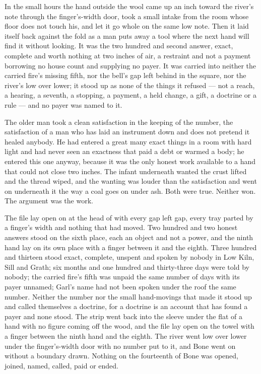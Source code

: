 In the small hours the hand outside the wool came up an inch toward the river's note through the finger's-width door, took a small intake from the room whose floor does not touch his, and let it go whole on the same low note. Then it laid itself back against the fold as a man puts away a tool where the next hand will find it without looking. It was the two hundred and second answer, exact, complete and worth nothing at two inches of air, a restraint and not a payment borrowing no house count and supplying no payer. It was carried into neither the carried fire's missing fifth, nor the bell's gap left behind in the square, nor the river's low over lower; it stood up as none of the things it refused --- not a reach, a hearing, a seventh, a stopping, a payment, a held change, a gift, a doctrine or a rule --- and no payer was named to it.

The older man took a clean satisfaction in the keeping of the number, the satisfaction of a man who has laid an instrument down and does not pretend it healed anybody. He had entered a great many exact things in a room with hard light and had never seen an exactness that paid a debt or warmed a body; he entered this one anyway, because it was the only honest work available to a hand that could not close two inches. The infant underneath wanted the crust lifted and the thread wiped, and the wanting was louder than the satisfaction and went on underneath it the way a coal goes on under ash. Both were true. Neither won. The argument was the work.

The file lay open on  at the head of  with every gap left gap, every tray parted by a finger's width and nothing that had moved. Two hundred and two honest answers stood on the sixth place, each an object and not a power, and the ninth hand lay on its own place with a finger between it and the eighth. Three hundred and thirteen stood exact, complete, unspent and spoken by nobody in Low Kiln, Sill and Grath; six months and one hundred and thirty-three days were told by nobody; the carried fire's fifth was unpaid the same number of days with its payer unnamed; Garl's name had not been spoken under the roof the same number. Neither the number nor the small hand-movings that made it stood up and called themselves a doctrine, for a doctrine is an account that has found a payer and none stood. The strip went back into the sleeve under the flat of a hand with no figure coming off the wood, and the file lay open on the towel with a finger between the ninth hand and the eighth. The river went low over lower under the finger's-width door with no number put to it, and Bone went on without a boundary drawn. Nothing on the fourteenth of Bone was opened, joined, named, called, paid or ended.
